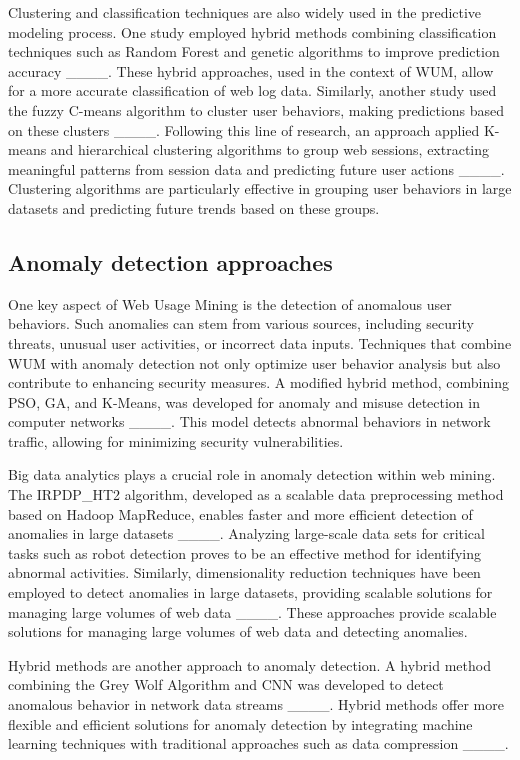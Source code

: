 Clustering and classification techniques are also widely used in the predictive modeling process. One study employed hybrid methods combining classification techniques such as Random Forest and genetic algorithms to improve prediction accuracy ____. These hybrid approaches, used in the context of WUM, allow for a more accurate classification of web log data. Similarly, another study used the fuzzy C-means algorithm to cluster user behaviors, making predictions based on these clusters ____. Following this line of research, an approach applied K-means and hierarchical clustering algorithms to group web sessions, extracting meaningful patterns from session data and predicting future user actions ____. Clustering algorithms are particularly effective in grouping user behaviors in large datasets and predicting future trends based on these groups.


\subsection{Anomaly detection approaches}

One key aspect of Web Usage Mining is the detection of anomalous user behaviors. Such anomalies can stem from various sources, including security threats, unusual user activities, or incorrect data inputs. Techniques that combine WUM with anomaly detection not only optimize user behavior analysis but also contribute to enhancing security measures. A modified hybrid method, combining PSO, GA, and K-Means, was developed for anomaly and misuse detection in computer networks ____. This model detects abnormal behaviors in network traffic, allowing for minimizing security vulnerabilities.

Big data analytics plays a crucial role in anomaly detection within web mining. The IRPDP\_HT2 algorithm, developed as a scalable data preprocessing method based on Hadoop MapReduce, enables faster and more efficient detection of anomalies in large datasets ____. Analyzing large-scale data sets for critical tasks such as robot detection proves to be an effective method for identifying abnormal activities. Similarly, dimensionality reduction techniques have been employed to detect anomalies in large datasets, providing scalable solutions for managing large volumes of web data ____. These approaches provide scalable solutions for managing large volumes of web data and detecting anomalies.

Hybrid methods are another approach to anomaly detection. A hybrid method combining the Grey Wolf Algorithm and CNN was developed to detect anomalous behavior in network data streams ____. Hybrid methods offer more flexible and efficient solutions for anomaly detection by integrating machine learning techniques with traditional approaches such as data compression ____.